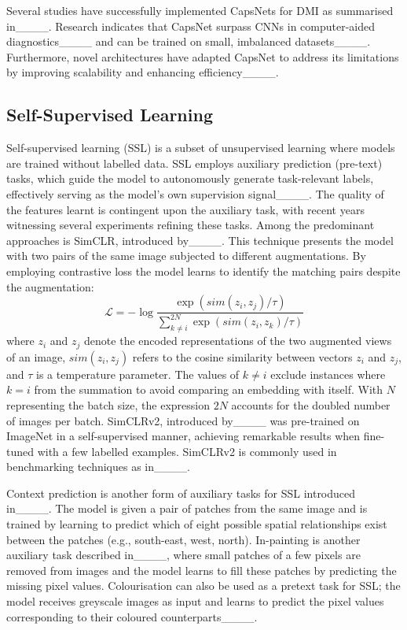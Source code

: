 Several studies have successfully implemented CapsNets for DMI as summarised in____. Research indicates that CapsNet surpass CNNs in computer-aided diagnostics____ and can be trained on small, imbalanced datasets____. Furthermore, novel architectures have adapted CapsNet to address its limitations by improving scalability and enhancing efficiency____.


\subsection{Self-Supervised Learning}
Self-supervised learning (SSL) is a subset of unsupervised learning where models are trained without labelled data. SSL employs auxiliary prediction (pre-text) tasks, which guide the model to autonomously generate task-relevant labels, effectively serving as the model's own supervision signal____. The quality of the features learnt is contingent upon the auxiliary task, with recent years witnessing several experiments refining these tasks. Among the predominant approaches is SimCLR, introduced by____. This technique presents the model with two pairs of the same image subjected to different augmentations. By employing contrastive loss the model learns to identify the matching pairs despite the augmentation:
\begin{equation}
\mathcal{L} = -\log \frac{\exp(sim(z_i, z_j)/\tau)}{\sum_{k \neq i}^{2N} \exp(sim(z_i, z_k)/\tau)}
\end{equation}
where $z_i$ and $z_j$ denote the encoded representations of the two augmented views of an image, $sim(z_i,z_j)$ refers to the cosine similarity between vectors $z_i$ and $z_j$, and $\tau$ is a temperature parameter. The values of $k \neq i$ exclude instances where $k=i$ from the summation to avoid comparing an embedding with itself. With $N$ representing the batch size, the expression $2N$ accounts for the doubled number of images per batch. SimCLRv2, introduced by____ was pre-trained on ImageNet in a self-supervised manner, achieving remarkable results when fine-tuned with a few labelled examples. SimCLRv2 is commonly used in benchmarking techniques as in____.

Context prediction is another form of auxiliary tasks for SSL introduced in____. The model is given a pair of patches from the same image and is trained by learning to predict which of eight possible spatial relationships exist between the patches (e.g., south-east, west, north). In-painting is another auxiliary task described in____, where small patches of a few pixels are removed from images and the model learns to fill these patches by predicting the missing pixel values. Colourisation can also be used as a pretext task for SSL; the model receives greyscale images as input and learns to predict the pixel values corresponding to their coloured counterparts____.

